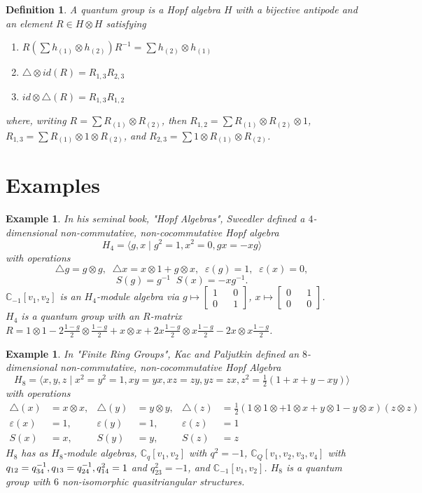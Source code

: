 \documentclass[12pt,a4paper]{article}
\newtheorem{example}[theorem]{Example}
\newtheorem{definition}[theorem]{Definition}
\newcommand\1{_{(1)}}
\newcommand\2{_{(2)}}
\begin{document}
\begin{definition}
A quantum group is a Hopf algebra $H$ with a bijective antipode and an element $R\in H\otimes H$ satisfying 
\begin{enumerate}
    \item $R\left(\sum h\1\otimes h\2\right)R^{-1}=\sum h\2\otimes h\1$
    \item $\triangle\otimes id(R)=R_{1,3}R_{2,3}$
    \item $id\otimes\triangle(R)=R_{1,3}R_{1,2}$
\end{enumerate}
where, writing $R=\sum R\1\otimes R\2$, then $R_{1,2}=\sum R\1\otimes R\2\otimes 1$, $R_{1,3}=\sum R\1\otimes 1\otimes R\2$, and $R_{2,3}=\sum 1\otimes R\1\otimes R\2$.
\end{definition}

\section{Examples}

\begin{example}
    In his seminal book, "Hopf Algebras", Sweedler defined a $4$-dimensional non-commutative, non-cocommutative Hopf algebra
    \[
    H_4=\langle g,x\;\vert\; g^2=1, x^2=0,gx=-xg\rangle
    \]
    with operations
    \[
    \triangle{g}=g\otimes g,\;\; \triangle{x}=x\otimes 1+g\otimes x,\;\;\varepsilon(g)=1,\;\;\varepsilon(x)=0,
    \]
    \[
    S(g)=g^{-1}\;\;S(x)=-xg^{-1}.
    \]
   $\mathbb{C}_{-1}[v_1,v_2]$ is an $H_4$-module algebra via $g\mapsto \begin{bmatrix} 1&&0\\0&&1\end{bmatrix}$, $x\mapsto\begin{bmatrix} 0&&1\\0&&0\end{bmatrix}$.
   \\$H_4$ is a quantum group with an $R$-matrix $R=1\otimes 1-2\tfrac{1-g}{2}\otimes\tfrac{1-g}{2}+x\otimes x+2x\tfrac{1-g}{2}\otimes x\tfrac{1-g}{2}-2x\otimes x\tfrac{1-g}{2}$.
\end{example}

\begin{example}
 In "Finite Ring Groups", Kac and Paljutkin defined an $8$-dimensional non-commutative, non-cocommutative Hopf Algebra
 \[
   H_8=\langle x,y,z\;\vert\; x^2=y^2=1,xy=yx,xz=zy,yz=zx,z^2=\tfrac{1}{2}(1+x+y-xy)\rangle 
 \]
 with operations
 \begin{align*}
   \triangle(x)&=x\otimes x, & \triangle(y)&=y\otimes y, & \triangle(z)&=\tfrac{1}{2}(1\otimes 1\otimes +1\otimes x+y\otimes 1-y\otimes x)(z\otimes z)\\
   \varepsilon(x)&=1, & \varepsilon(y)&=1, & \varepsilon(z)&=1\\
   S(x)&=x, & S(y)&=y, & S(z)&=z
 \end{align*}
$H_8$ has as $H_8$-module algebras, $\mathbb{C}_q[v_1,v_2]$ with $q^2=-1$, $\mathbb{C}_Q[v_1,v_2,v_3,v_4]$ with $q_{12}=q_{34}^{-1}, \\q_{13}=q_{24}^{-1}, q_{14}^2=1$ and $q_{23}^2=-1$, and $\mathbb{C}_{-1}[v_1,v_2]$.
$H_8$ is a quantum group with $6$ non-isomorphic quasitriangular structures.
\end{example}
\end{document}

